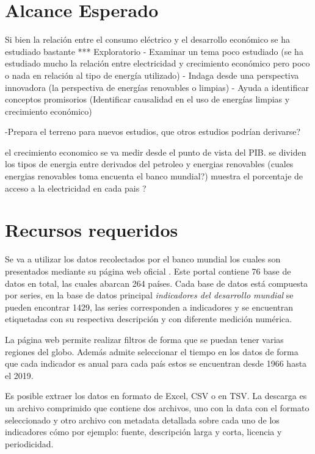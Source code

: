 \documentclass{article}
\begin{document}
\section{Alcance Esperado}

Si bien la relación entre el consumo eléctrico y el desarrollo económico se ha estudiado bastante  
*** Exploratorio
- Examinar un tema poco estudiado (se ha estudiado mucho la relación entre electricidad y crecimiento económico pero poco o nada en relación al tipo de energía utilizado)
- Indaga desde una perspectiva innovadora (la perspectiva de energías renovables o limpias)
- Ayuda a identificar conceptos promisorios (Identificar causalidad en el uso de energías limpias y crecimiento económico)

-Prepara el terreno para nuevos estudios, que otros estudios podrían derivarse?

el crecimiento economico se va medir desde el punto de vista del PIB.
se dividen los tipos de energia entre derivados del petroleo y energias renovables (cuales energias renovables toma encuenta el banco mundial?)
muestra el porcentaje de acceso a la electricidad en cada pais ? %

\section{Recursos requeridos}

Se va a utilizar los datos recolectados por el banco mundial los cuales son presentados mediante su página web oficial \cite{noauthor_indicadores_nodate}. Este portal contiene 76 base de datos en total, las cuales abarcan 264 países. Cada base de datos está compuesta por series, en la base de datos principal \textit{indicadores del desarrollo mundial} se pueden encontrar 1429, las series corresponden a indicadores y se encuentran etiquetadas con su respectiva descripción y con diferente medición numérica.

La página web permite realizar filtros de forma que se puedan tener varias regiones del globo. Además admite seleccionar el tiempo en los datos de forma que cada indicador es anual para cada país estos se encuentran desde 1966 hasta el 2019. 

Es posible extraer los datos en formato de Excel, CSV o en TSV. La descarga es un archivo comprimido que contiene dos archivos, uno con la data con el formato seleccionado y otro  archivo con metadata detallada sobre cada uno de los indicadores cómo por ejemplo: fuente, descripción larga y corta, licencia y periodicidad. 
\end{document}

